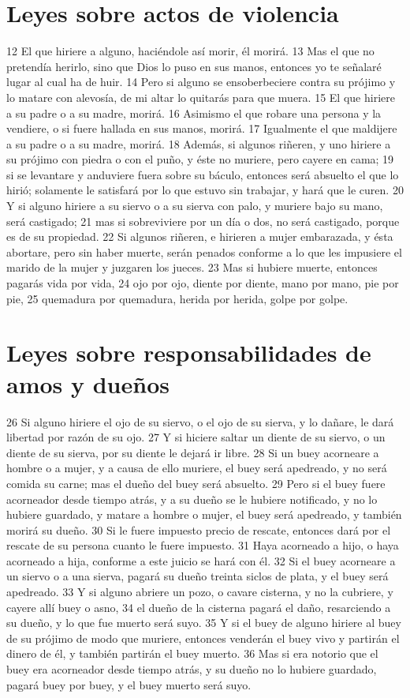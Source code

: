 \section{Leyes sobre actos de violencia}

12 El que hiriere a alguno, haciéndole así morir, él morirá.
13 Mas el que no pretendía herirlo, sino que Dios lo puso en sus manos, entonces yo te señalaré lugar al cual ha de huir.
14 Pero si alguno se ensoberbeciere contra su prójimo y lo matare con alevosía, de mi altar lo quitarás para que muera.
15 El que hiriere a su padre o a su madre, morirá.
16 Asimismo el que robare una persona y la vendiere, o si fuere hallada en sus manos, morirá.
17 Igualmente el que maldijere a su padre o a su madre, morirá.
18 Además, si algunos riñeren, y uno hiriere a su prójimo con piedra o con el puño, y éste no muriere, pero cayere en cama;
19 si se levantare y anduviere fuera sobre su báculo, entonces será absuelto el que lo hirió; solamente le satisfará por lo que estuvo sin trabajar, y hará que le curen.
20 Y si alguno hiriere a su siervo o a su sierva con palo, y muriere bajo su mano, será castigado;
21 mas si sobreviviere por un día o dos, no será castigado, porque es de su propiedad.
22 Si algunos riñeren, e hirieren a mujer embarazada, y ésta abortare, pero sin haber muerte, serán penados conforme a lo que les impusiere el marido de la mujer y juzgaren los jueces.
23 Mas si hubiere muerte, entonces pagarás vida por vida,
24 ojo por ojo, diente por diente, mano por mano, pie por pie,
25 quemadura por quemadura, herida por herida, golpe por golpe.

\section{Leyes sobre responsabilidades de amos y dueños}

26 Si alguno hiriere el ojo de su siervo, o el ojo de su sierva, y lo dañare, le dará libertad por razón de su ojo.
27 Y si hiciere saltar un diente de su siervo, o un diente de su sierva, por su diente le dejará ir libre.
28 Si un buey acorneare a hombre o a mujer, y a causa de ello muriere, el buey será apedreado, y no será comida su carne; mas el dueño del buey será absuelto.
29 Pero si el buey fuere acorneador desde tiempo atrás, y a su dueño se le hubiere notificado, y no lo hubiere guardado, y matare a hombre o mujer, el buey será apedreado, y también morirá su dueño.
30 Si le fuere impuesto precio de rescate, entonces dará por el rescate de su persona cuanto le fuere impuesto.
31 Haya acorneado a hijo, o haya acorneado a hija, conforme a este juicio se hará con él.
32 Si el buey acorneare a un siervo o a una sierva, pagará su dueño treinta siclos de plata,  y el buey será apedreado.
33 Y si alguno abriere un pozo, o cavare cisterna, y no la cubriere, y cayere allí buey o asno,
34 el dueño de la cisterna pagará el daño, resarciendo a su dueño, y lo que fue muerto será suyo.
35 Y si el buey de alguno hiriere al buey de su prójimo de modo que muriere, entonces venderán el buey vivo y partirán el dinero de él, y también partirán el buey muerto.
36 Mas si era notorio que el buey era acorneador desde tiempo atrás, y su dueño no lo hubiere guardado, pagará buey por buey, y el buey muerto será suyo.

